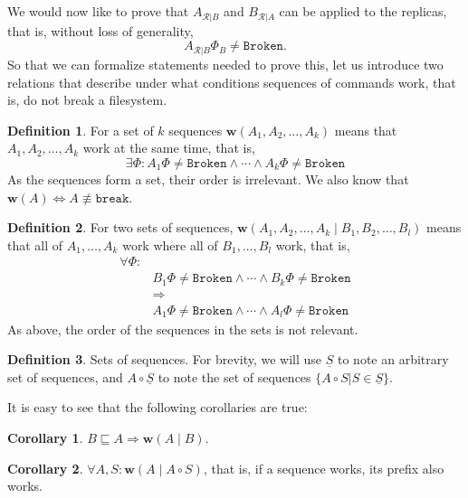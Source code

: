 \documentclass[12pt]{article}
\newcommand{\fsbroken}{\mathtt{Broken}} %
\newcommand{\FS}{\Phi} %
\newcommand{\cbrk}{\mathtt{break}} %
\newcommand{\cc}{\circ} %
\newcommand{\eqext}{\sqsubseteq} %
\newcommand{\nequiv}{\not\equiv}
\newcommand{\workssign}{\mathbf{w}}
\newcommand{\works}[1]{\workssign({#1})}
\newcommand{\worksc}[2]{\workssign({#1}\mathrel{|}{#2})}
\newcommand{\seqset}[1]{\underline{#1}} %
\newcommand{\recchar}[3]{{#1}^{#3}_{\mathcal{R}|{#2}}}
\newcommand{\reca}{\recchar{A}{B}{}} %
\newcommand{\recb}{\recchar{B}{A}{}} %
\theoremstyle{definition}
\newtheorem{mydef}{Definition}
\newtheorem{mycor}{Corollary}
\begin{document}
We would now like to prove that $\reca$ and $\recb$ can be applied to the replicas,
that is, without loss of generality,
\[ \reca\FS_B\neq\fsbroken. \]
So that we can formalize statements needed to prove this,
let us introduce two relations that describe under what conditions
sequences of commands work, that is, do not break a filesystem.



\begin{mydef}
For a set of $k$ sequences
$\works{A_1,A_2,\ldots,A_k}$ means that 
$A_1,A_2,\ldots,A_k$ work at the same time, that is,
\[\exists \FS: A_1\FS\neq\fsbroken \wedge \cdots \wedge A_k\FS\neq\fsbroken\]
As the sequences form a set, their order is irrelevant.
We also know that $\works{A} \Leftrightarrow A\nequiv \cbrk$. 
\end{mydef}

\begin{mydef}
For two sets of sequences, $\worksc{A_1,A_2,\ldots,A_k}{B_1,B_2,\ldots,B_l}$ means that 
all of $A_1,\ldots,A_k$ work where all of $B_1,\ldots,B_l$ work,
that is,
\begin{align*}
\forall \FS:&\\ 
&B_1\FS\neq\fsbroken \wedge \cdots \wedge B_k\FS\neq\fsbroken\\
&\Rightarrow\\
&A_1\FS\neq\fsbroken \wedge \cdots \wedge A_l\FS\neq\fsbroken
\end{align*}
As above, the order of the sequences in the sets is not relevant.
\end{mydef}

\begin{mydef}{Sets of sequences.}
For brevity, we will use $\seqset{S}$ to note an arbitrary set of sequences,
and $A\cc\seqset{S}$ to note the set of sequences $\{A\cc S|S\in\seqset{S}\}$.
\end{mydef}

It is easy to see that the following corollaries are true:


\begin{mycor}
$B\eqext A \Rightarrow \worksc{A}{B}$.
\end{mycor}

\begin{mycor}\label{worksextpostfix}
$\forall A,S: \worksc{A}{A\cc S}$, that is, if a sequence works, its prefix also works.
\end{mycor}
\end{document}

